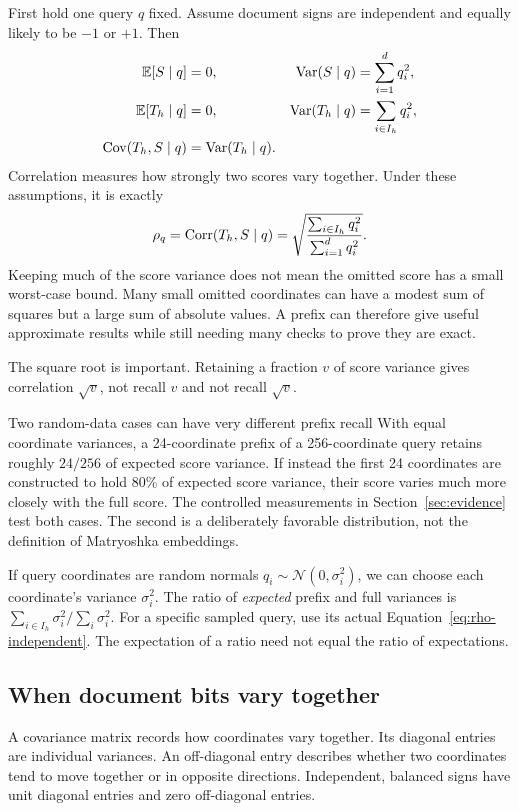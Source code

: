 First hold one query $q$ fixed. Assume document signs are independent and equally
likely to be $-1$ or $+1$. Then
\begin{align}
\mathbb E[S\mid q]&=0,&\operatorname{Var}(S\mid q)&=\sum_{i=1}^{d}q_i^2,\\
\mathbb E[T_h\mid q]&=0,&\operatorname{Var}(T_h\mid q)&=\sum_{i\in I_h}q_i^2,\\
\operatorname{Cov}(T_h,S\mid q)&=\operatorname{Var}(T_h\mid q).&&
\end{align}
Correlation measures how strongly two scores vary together. Under these assumptions, it is exactly
\begin{equation}
\rho_q=\operatorname{Corr}(T_h,S\mid q)=
\sqrt{\frac{\sum_{i\in I_h}q_i^2}{\sum_{i=1}^{d}q_i^2}}.
\label{eq:rho-independent}
\end{equation}
Keeping much of the score variance does not mean the omitted score has a small worst-case bound. Many small omitted coordinates can have a modest sum of squares but a large sum of absolute values. A prefix can therefore give useful approximate results while still needing many checks to prove they are exact.

The square root is important. Retaining a fraction $v$ of score variance gives correlation
$\sqrt v$, not recall $v$ and not recall $\sqrt v$.

\begin{examplebox}{Two random-data cases can have very different prefix recall}
With equal coordinate variances, a 24-coordinate prefix of a 256-coordinate query retains
roughly $24/256$ of expected score variance. If instead the first 24 coordinates are constructed
to hold 80\% of expected score variance, their score varies much more closely with the
full score. The controlled measurements in Section~\ref{sec:evidence} test both cases. The
second is a deliberately favorable distribution, not the definition of Matryoshka embeddings.
\end{examplebox}

If query coordinates are random normals $q_i\sim\mathcal N(0,\sigma_i^2)$, we can choose each coordinate's variance $\sigma_i^2$. The ratio of \emph{expected} prefix and full variances is
$\sum_{i\in I_h}\sigma_i^2/\sum_i\sigma_i^2$. For a specific sampled query, use its actual
Equation~\eqref{eq:rho-independent}. The expectation of a ratio need not equal the ratio of
expectations.

\subsection{When document bits vary together}
A covariance matrix records how coordinates vary together. Its diagonal entries are individual variances. An off-diagonal entry describes whether two coordinates tend to move together or in opposite directions. Independent, balanced signs have unit diagonal entries and zero off-diagonal entries.

